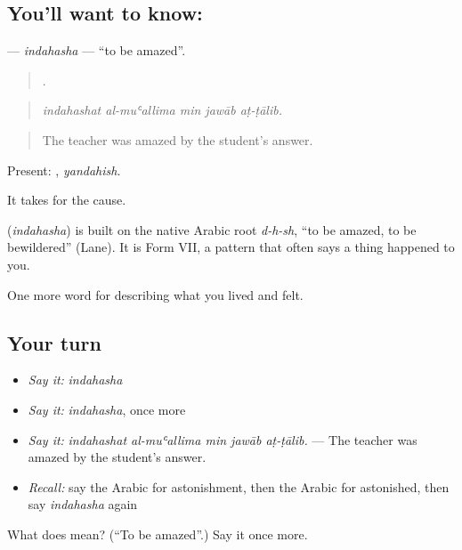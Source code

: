 \subsection*{You'll want to know: }
\textbf{} — \emph{indahasha} — \textquotedblleft{}to be amazed\textquotedblright{}.

\begin{quote}
    .
\end{quote}

\begin{quote}
\emph{indahashat al-muʿallima min jawāb aṭ-ṭālib.}
\end{quote}

\begin{quote}
The teacher was amazed by the student's answer.
\end{quote}

Present: , \emph{yandahish}.

It takes  for the cause.

\begin{cousinweb}
\textbf{} (\emph{indahasha}) is built on the native Arabic root \emph{d-h-sh}, \textquotedblleft{}to be amazed, to be bewildered\textquotedblright{} (Lane). It is Form VII, a pattern that often says a thing happened to you.
\end{cousinweb}

\begin{grammarlens}[title={What you've built}]
One more word for describing what you lived and felt.
\end{grammarlens}

\subsection*{Your turn}
\begin{itemize}
\raggedright
  \item \emph{Say it:} \emph{indahasha}
  \item \emph{Say it:} \emph{indahasha}, once more
  \item \emph{Say it:} \emph{indahashat al-muʿallima min jawāb aṭ-ṭālib.} — The teacher was amazed by the student's answer.
  \item \emph{Recall:} say the Arabic for astonishment, then the Arabic for astonished, then say \emph{indahasha} again
\end{itemize}

\begin{tcolorbox}[breakable,colback=teal!4,colframe=teal!35!black,title={Before you move on}]
What does  mean? (\textquotedblleft{}To be amazed\textquotedblright{}.) Say it once more.
\end{tcolorbox}
